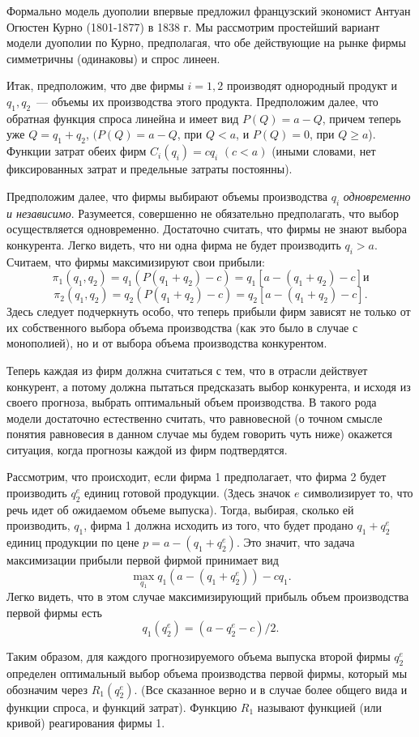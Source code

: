 \documentclass[12pt]{article}
\begin{document}
Формально модель дуополии впервые предложил французский экономист
Антуан Огюстен Курно (1801-1877) в 1838 г. Мы рассмотрим простейший
вариант модели дуополии по Курно, предполагая, что обе действующие
на рынке фирмы симметричны (одинаковы) и спрос линеен.

Итак, предположим, что две фирмы $i=1,2$ производят однородный
продукт и $q_1,q_2$~---  объемы их производства этого продукта.
Предположим далее, что обратная функция спроса линейна и имеет вид
$P(Q)=a-Q$, причем теперь уже $Q=q_1+q_2$,
$(P(Q)=a-Q$, при $Q<a$, и $P(Q)=0$, при $Q\ge a$). Функции затрат
обеих фирм $C_i(q_i)=cq_i$ $(c<a)$ (иными словами, нет фиксированных
затрат и предельные затраты постоянны).

Предположим далее, что фирмы выбирают объемы производства $q_i$ {\it
одновременно и независимо}. Разумеется, совершенно не обязательно
предполагать, что выбор осуществляется одновременно. Достаточно
считать, что фирмы не знают выбора конкурента. Легко видеть, что
ни одна фирма не будет производить $q_i>a$. Считаем, что фирмы
максимизируют свои прибыли:
$$
\pi_1(q_1,q_2)=q_1(P(q_1+q_2)-c)=q_1[a-(q_1+q_2)-c] и
$$
$$
\pi_2(q_1,q_2)=q_2(P(q_1+q_2)-c)=q_2[a-(q_1+q_2)-c].
$$
Здесь следует подчеркнуть особо, что теперь прибыли фирм зависят не
только от их собственного выбора объема производства (как это было в
случае с монополией), но и от выбора объема производства
конкурентом.

Теперь каждая из фирм должна считаться с тем, что в отрасли действует
конкурент, а потому должна пытаться предсказать выбор конкурента, и
исходя из своего прогноза, выбрать оптимальный объем производства. В
такого рода модели достаточно естественно считать, что равновесной
(о точном смысле понятия равновесия в данном случае мы будем говорить
чуть ниже) окажется ситуация, когда прогнозы каждой из фирм подтвердятся.

Рассмотрим, что происходит, если фирма 1 предполагает, что фирма 2
будет производить $q^e_2$ единиц готовой продукции. (Здесь значок $e$
символизирует то, что речь идет об ожидаемом объеме выпуска). Тогда, выбирая,
сколько ей производить, $q_1$, фирма 1 должна исходить из того, что
будет продано $q_1 + q^e_2$ единиц продукции по цене $p=a-(q_1 +
q^e_2)$. Это значит, что задача максимизации прибыли первой фирмой
принимает вид
$$
\max_{q_1}q_1(a-(q_1 + q^e_2))-cq_1.
$$
Легко видеть, что в этом случае максимизирующий прибыль объем
производства первой фирмы есть
$$
q_1(q^e_2)=(a-q^e_2-c)/2.
$$

Таким образом, для каждого прогнозируемого объема выпуска второй
фирмы  $q^e_2$ определен оптимальный выбор объема производства
первой фирмы, который мы обозначим через $R_1(q^e_2)$. (Все
сказанное верно и в случае более общего вида и функции спроса, и
функций затрат). Функцию $R_1$ называют функцией (или кривой)
реагирования фирмы 1.
\end{document}
